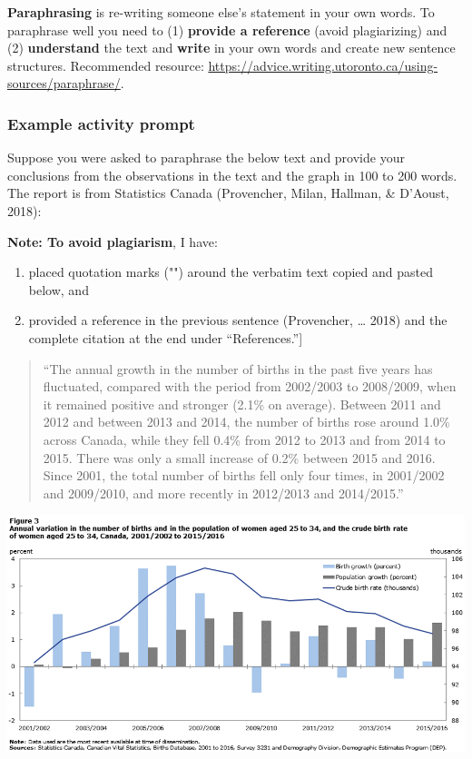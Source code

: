 \documentclass[
  openany]{book}
\begin{document}
\textbf{Paraphrasing} is re-writing someone else's statement in your own words. To paraphrase well you need to (1) \textbf{provide a reference} (avoid plagiarizing) and (2) \textbf{understand} the text and \textbf{write} in your own words and create new sentence structures. Recommended resource: \url{https://advice.writing.utoronto.ca/using-sources/paraphrase/}.

\hypertarget{example-activity-prompt}{%
\subsubsection{Example activity prompt}\label{example-activity-prompt}}

Suppose you were asked to paraphrase the below text and provide your conclusions from the observations in the text and the graph in 100 to 200 words. The report is from Statistics Canada (Provencher, Milan, Hallman, \& D'Aoust, 2018):

\textbf{Note: To avoid plagiarism}, I have:

\begin{enumerate}
\def\labelenumi{(\arabic{enumi})}
\item
  placed quotation marks ("") around the verbatim text copied and pasted below, and
\item
  provided a reference in the previous sentence (Provencher, \ldots{} 2018) and the complete citation at the end under ``References.''{]}
\end{enumerate}

\begin{quote}
``The annual growth in the number of births in the past five years has fluctuated, compared with the period from 2002/2003 to 2008/2009, when it remained positive and stronger (2.1\% on average). Between 2011 and 2012 and between 2013 and 2014, the number of births rose around 1.0\% across Canada, while they fell 0.4\% from 2012 to 2013 and from 2014 to 2015. There was only a small increase of 0.2\% between 2015 and 2016. Since 2001, the total number of births fell only four times, in 2001/2002 and 2009/2010, and more recently in 2012/2013 and 2014/2015.''
\end{quote}

\begin{center}\includegraphics[width=1\linewidth]{images/m2/paraphrase} \end{center}
\end{document}
